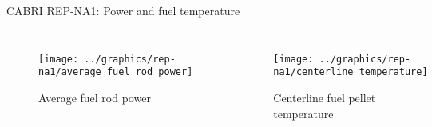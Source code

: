 \begin{frame}{CABRI REP-NA1: Power and fuel temperature}
  \footnotesize 
  
  \begin{columns}[t]


  \begin{figure}[h]
    \texttt{[image: ../graphics/rep-na1/average\_fuel\_rod\_power]}
    \caption{Average fuel rod power}
  \end{figure}  


  \begin{figure}[h]
    \texttt{[image: ../graphics/rep-na1/centerline\_temperature]}
    \caption{Centerline fuel pellet temperature}
  \end{figure}  
  
  \end{columns}

\end{frame}
